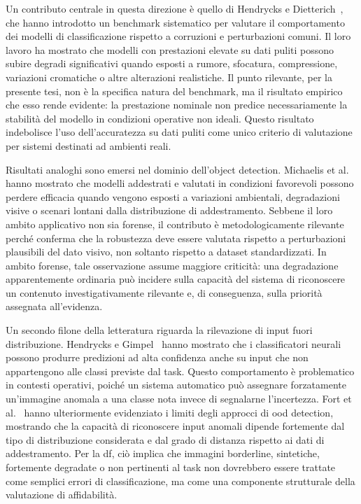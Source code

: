 Un contributo centrale in questa direzione è quello di Hendrycks e Dietterich~\cite{hendrycks2019benchmarking}, che hanno introdotto un benchmark sistematico per valutare il comportamento dei modelli di classificazione rispetto a corruzioni e perturbazioni comuni. Il loro lavoro ha mostrato che modelli con prestazioni elevate su dati puliti possono subire degradi significativi quando esposti a rumore, sfocatura, compressione, variazioni cromatiche o altre alterazioni realistiche. Il punto rilevante, per la presente tesi, non è la specifica natura del benchmark, ma il risultato empirico che esso rende evidente: la prestazione nominale non predice necessariamente la stabilità del modello in condizioni operative non ideali. Questo risultato indebolisce l'uso dell'accuratezza su dati puliti come unico criterio di valutazione per sistemi destinati ad ambienti reali.

Risultati analoghi sono emersi nel dominio dell'object detection. Michaelis et al.~\cite{michaelis2019winter} hanno mostrato che modelli addestrati e valutati in condizioni favorevoli possono perdere efficacia quando vengono esposti a variazioni ambientali, degradazioni visive o scenari lontani dalla distribuzione di addestramento. Sebbene il loro ambito applicativo non sia forense, il contributo è metodologicamente rilevante perché conferma che la robustezza deve essere valutata rispetto a perturbazioni plausibili del dato visivo, non soltanto rispetto a dataset standardizzati. In ambito forense, tale osservazione assume maggiore criticità: una degradazione apparentemente ordinaria può incidere sulla capacità del sistema di riconoscere un contenuto investigativamente rilevante e, di conseguenza, sulla priorità assegnata all'evidenza.

Un secondo filone della letteratura riguarda la rilevazione di input fuori distribuzione. Hendrycks e Gimpel~\cite{hendrycks2017baseline} hanno mostrato che i classificatori neurali possono produrre predizioni ad alta confidenza anche su input che non appartengono alle classi previste dal task. Questo comportamento è problematico in contesti operativi, poiché un sistema automatico può assegnare forzatamente un'immagine anomala a una classe nota invece di segnalarne l'incertezza. Fort et al.~\cite{fort2021exploring} hanno ulteriormente evidenziato i limiti degli approcci di \gls{ood} detection, mostrando che la capacità di riconoscere input anomali dipende fortemente dal tipo di distribuzione considerata e dal grado di distanza rispetto ai dati di addestramento. Per la \gls{df}, ciò implica che immagini borderline, sintetiche, fortemente degradate o non pertinenti al task non dovrebbero essere trattate come semplici errori di classificazione, ma come una componente strutturale della valutazione di affidabilità.

